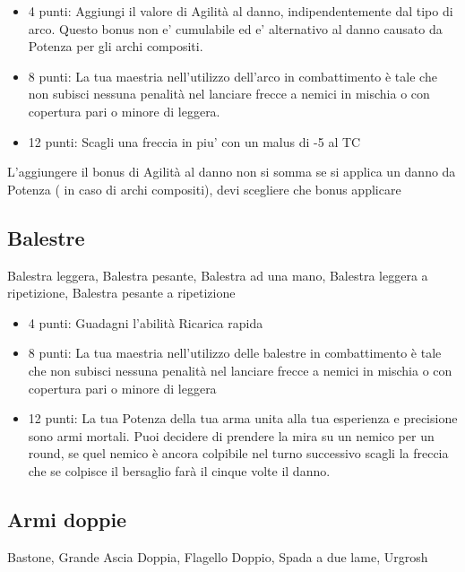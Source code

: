 \documentclass[a4paper,11pt,twoside,openany]{book}
\begin{document}
\begin{itemize}

	\item 4 punti: Aggiungi il valore di Agilità al danno, indipendentemente dal tipo di arco. Questo bonus non e' cumulabile ed e' alternativo al danno causato da Potenza per gli archi compositi.

	\item 8 punti: La tua maestria nell'utilizzo dell'arco in combattimento è tale che non subisci nessuna penalità nel lanciare frecce a nemici in mischia o con copertura pari o minore di leggera.

	\item 12 punti: Scagli una freccia in piu' con un malus di -5 al TC

\end{itemize}

L'aggiungere il bonus di Agilità al danno non si somma se si applica un danno da Potenza ( in caso di archi compositi), devi scegliere che bonus applicare

\subsection{Balestre}Balestra leggera, Balestra pesante, Balestra ad una mano, Balestra leggera a ripetizione, Balestra pesante a ripetizione

\begin{itemize}

	\item 4 punti: Guadagni l'abilità Ricarica rapida

	\item 8 punti: La tua maestria nell'utilizzo delle balestre in combattimento è tale che non subisci nessuna penalità nel lanciare frecce a nemici in mischia o con copertura pari o minore di leggera

	\item 12 punti: La tua Potenza della tua arma unita alla tua esperienza e precisione sono armi mortali. Puoi decidere di prendere la mira su un nemico per un round, se quel nemico è ancora colpibile nel turno successivo scagli la freccia che se colpisce il bersaglio farà il cinque volte il danno.

\end{itemize}

\subsection{Armi doppie} Bastone, Grande Ascia Doppia, Flagello Doppio, Spada a due lame, Urgrosh
\end{document}
